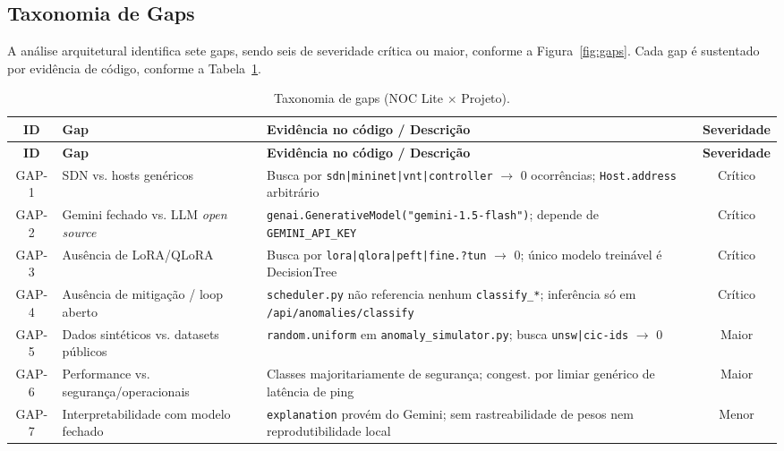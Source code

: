 \documentclass[12pt,a4paper]{article}
\begin{document}
\subsection{Taxonomia de Gaps}
\label{sec:gaps}

A análise arquitetural identifica sete gaps, sendo seis de severidade
crítica ou maior, conforme a Figura~\ref{fig:gaps}. Cada gap é sustentado
por evidência de código, conforme a Tabela~\ref{tab:gaps}.

\footnotesize
\setlength{\tabcolsep}{0.5pt}
\begin{longtable}{cp{3.2cm}>{\raggedright\arraybackslash}p{2.6cm}c}
\caption{Taxonomia de gaps (NOC Lite $\times$ Projeto).}
\label{tab:gaps}\\
\toprule
\textbf{ID} & \textbf{Gap} & \raggedright\textbf{Evidência no código / Descrição} & \textbf{Severidade} \\
\midrule
\endfirsthead
\toprule
\textbf{ID} & \textbf{Gap} & \raggedright\textbf{Evidência no código / Descrição} & \textbf{Severidade} \\
\midrule
\endhead
GAP-1 & SDN vs. hosts genéricos & Busca por \texttt{sdn|mininet|vnt|controller} $\rightarrow$ 0 ocorrências; \texttt{Host.address} arbitrário & Crítico \\
GAP-2 & Gemini fechado vs. LLM \textit{open source} & \texttt{genai.GenerativeModel("gemini-1.5-flash")}; depende de \texttt{GEMINI\_API\_KEY} & Crítico \\
GAP-3 & Ausência de LoRA/QLoRA & Busca por \texttt{lora|qlora|peft|fine.?tun} $\rightarrow$ 0; único modelo treinável é DecisionTree & Crítico \\
GAP-4 & Ausência de mitigação / loop aberto & \texttt{scheduler.py} não referencia nenhum \texttt{classify\_*}; inferência só em \texttt{/api/anomalies/classify} & Crítico \\
GAP-5 & Dados sintéticos vs. datasets públicos & \texttt{random.uniform} em \texttt{anomaly\_simulator.py}; busca \texttt{unsw|cic-ids} $\rightarrow$ 0 & Maior \\
GAP-6 & Performance vs. segurança/operacionais & Classes majoritariamente de segurança; congest. por limiar genérico de latência de ping & Maior \\
GAP-7 & Interpretabilidade com modelo fechado & \texttt{explanation} provém do Gemini; sem rastreabilidade de pesos nem reprodutibilidade local & Menor \\
\bottomrule
\end{longtable}
\end{document}

